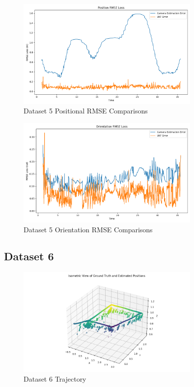 \documentclass{article}
\begin{document}
\begin{figure}[H]
    \centering
    \includegraphics[width=0.8\textwidth]{./imgs/task4/studentdata5_ukf_position_rmse.png}
    \caption{Dataset 5 Positional RMSE Comparisons}
\end{figure}

\begin{figure}[H]
    \centering
    \includegraphics[width=0.8\textwidth]{./imgs/task4/studentdata5_ukf_orientation_rmse.png}
    \caption{Dataset 5 Orientation RMSE Comparisons}
\end{figure}

\subsection*{Dataset 6}

\begin{figure}[H]
    \centering
    \includegraphics[width=0.8\textwidth]{./imgs/task4/studentdata6_ukf_isometric.png}
    \caption{Dataset 6 Trajectory}
\end{figure}
\end{document}
